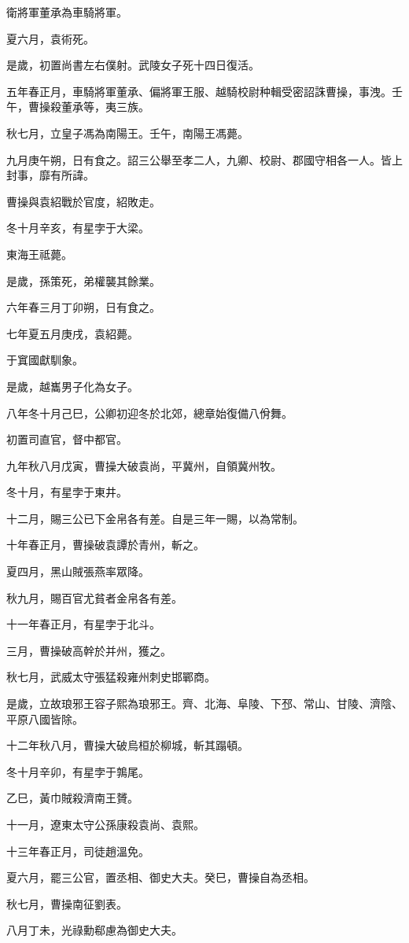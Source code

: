 \begin{pinyinscope}
衛將軍董承為車騎將軍。

夏六月，袁術死。

是歲，初置尚書左右僕射。武陵女子死十四日復活。

五年春正月，車騎將軍董承、偏將軍王服、越騎校尉种輯受密詔誅曹操，事洩。壬午，曹操殺董承等，夷三族。

秋七月，立皇子馮為南陽王。壬午，南陽王馮薨。

九月庚午朔，日有食之。詔三公舉至孝二人，九卿、校尉、郡國守相各一人。皆上封事，靡有所諱。

曹操與袁紹戰於官度，紹敗走。

冬十月辛亥，有星孛于大梁。

東海王祗薨。

是歲，孫策死，弟權襲其餘業。

六年春三月丁卯朔，日有食之。

七年夏五月庚戌，袁紹薨。

于窴國獻馴象。

是歲，越巂男子化為女子。

八年冬十月己巳，公卿初迎冬於北郊，總章始復備八佾舞。

初置司直官，督中都官。

九年秋八月戊寅，曹操大破袁尚，平冀州，自領冀州牧。

冬十月，有星孛于東井。

十二月，賜三公已下金帛各有差。自是三年一賜，以為常制。

十年春正月，曹操破袁譚於青州，斬之。

夏四月，黑山賊張燕率眾降。

秋九月，賜百官尤貧者金帛各有差。

十一年春正月，有星孛于北斗。

三月，曹操破高幹於并州，獲之。

秋七月，武威太守張猛殺雍州刺史邯鄲商。

是歲，立故琅邪王容子熙為琅邪王。齊、北海、阜陵、下邳、常山、甘陵、濟陰、平原八國皆除。

十二年秋八月，曹操大破烏桓於柳城，斬其蹋頓。

冬十月辛卯，有星孛于鶉尾。

乙巳，黃巾賊殺濟南王贇。

十一月，遼東太守公孫康殺袁尚、袁熙。

十三年春正月，司徒趙溫免。

夏六月，罷三公官，置丞相、御史大夫。癸巳，曹操自為丞相。

秋七月，曹操南征劉表。

八月丁未，光祿勳郗慮為御史大夫。


\end{pinyinscope}
